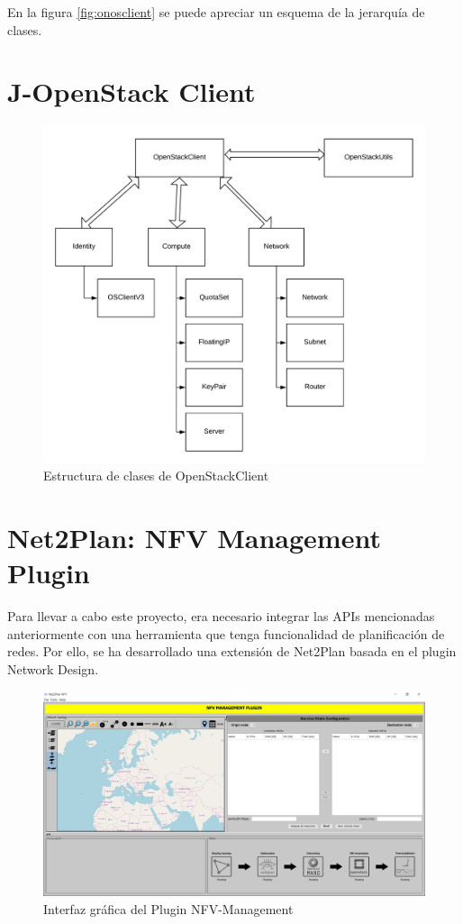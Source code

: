 En la figura \ref{fig:onosclient} se puede apreciar un esquema de la jerarquía de clases. 


\section{J-OpenStack Client}
\label{sec:openstackclient}

\begin{figure}[!ht]
	\centering
	\includegraphics[width=1\linewidth]{imagenes/OpenStackClient}
	\caption{Estructura de clases de OpenStackClient}
	\label{fig:openstackclient}
\end{figure}

\section{Net2Plan: NFV Management Plugin}
\label{sec:nfvplugin}

Para llevar a cabo este proyecto, era necesario integrar las APIs mencionadas anteriormente con una herramienta que tenga funcionalidad de planificación de redes. Por ello, se ha desarrollado una extensión de Net2Plan basada en el plugin Network Design.


\begin{figure}[!ht]
	\centering
	\includegraphics[width=1\linewidth]{imagenes/nfvplugin_dashboard}
	\caption{Interfaz gráfica del Plugin NFV-Management}
	\label{fig:nfvplugindash}
\end{figure}

